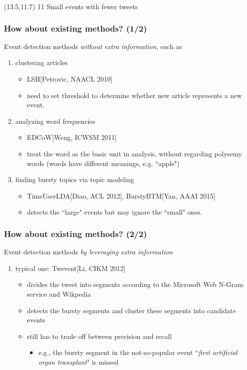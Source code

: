 \documentclass{beamer}
\begin{document}
\begin{frame}
 \begin{textblock}{0.1}(13.5,11.7)
  \footnotesize{11 Small events with fewer tweets}
 \end{textblock}

\end{frame}

\begin{frame}
\frametitle{How about existing methods? (1/2)}
Event detection methods \textit{without extra information}, such as
\begin{enumerate}
\item clustering articles
\begin{itemize}
	\item LSH[Petrovic, NAACL 2010]
	\item need to set threshold to determine whether new article represents a new event.
\end{itemize}
\item analyzing word frequencies
\begin{itemize}
	\item EDCoW[Weng, ICWSM 2011]
	\item treat the word as the basic unit in analysis, without regarding polysemy words (words have different meanings, e.g. ``apple")
\end{itemize}
\item finding bursty topics via topic modeling
\begin{itemize}
	\item TimeUserLDA[Diao, ACL 2012], BurstyBTM[Yan, AAAI 2015]
	\item detects the ``large" events but may ignore the ``small" ones. 
\end{itemize}
\end{enumerate}
\end{frame}

\begin{frame}
\frametitle{How about existing methods? (2/2)}
Event detection methods \textit{by leveraging extra information}
\begin{enumerate}
	\item typical one: Twevent[Li, CIKM 2012]
	\begin{itemize}
		\item divides the tweet into segments according to the Microsoft Web N-Gram service and Wikpedia
		\item detects the bursty segments and cluster these segments into candidate events
		\item still has to trade off between precision and recall
		\begin{itemize}
			\item e.g., the bursty segment in the not-so-popular event ``\textit{first artificial organ transplant}" is missed
		\end{itemize}
	\end{itemize}
\end{enumerate}
\end{frame}
\end{document}
